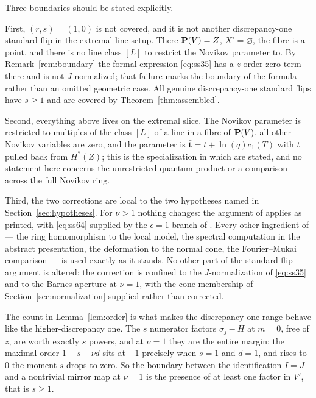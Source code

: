 Three boundaries should be stated explicitly.

First, \((r,s)=(1,0)\) is not covered, and it is not another
discrepancy-one standard flip in the extremal-line setup.  There
\(\mathbf P(V)=Z\), \(X'=\varnothing\), the fibre is a point, and there is no line
class \([L]\) to restrict the Novikov parameter to.  By
Remark~\ref{rem:boundary} the formal expression \eqref{eq:ss35} has a
\(z\)-order-zero term there and is not \(J\)-normalized; that failure marks
the boundary of the formula rather than an omitted geometric case.  All
genuine discrepancy-one standard flips have \(s\ge1\) and are covered by
Theorem~\ref{thm:assembled}.

Second, everything above lives on the extremal slice.  The Novikov
parameter is restricted to multiples of the class \([L]\) of a line in a
fibre of \(\mathbf P(V)\), all other Novikov variables are zero, and the parameter
is \(\bar{\mathbf t}=t+\ln(q)c_{1}(T)\) with \(t\) pulled back from
\(H^{*}(Z)\); this is the specialization in which \cite[Theorems~1.2
and~1.4]{SS} are stated, and no statement here concerns the unrestricted
quantum product or a comparison across the full Novikov ring.

Third, the two corrections are local to the two hypotheses named in
Section~\ref{sec:hypotheses}.  For \(\nu>1\) nothing changes: the argument
of \cite{SS} applies as printed, with \eqref{eq:ss64} supplied by the
\(\epsilon=1\) branch of \cite[Theorem~A.1]{SS}.  Every other
ingredient of \cite{SS} --- the ring homomorphism to the local model, the
spectral computation in the abstract presentation, the deformation to the
normal cone, the Fourier--Mukai comparison --- is used exactly as it stands.
No other part of the standard-flip argument is altered: the correction is
confined to the \(J\)-normalization of \eqref{eq:ss35} and to the Barnes
aperture at \(\nu=1\), with the cone membership of
Section~\ref{sec:normalization} supplied rather than corrected.

The count in Lemma~\ref{lem:order} is what makes the discrepancy-one range
behave like the higher-discrepancy one.  The \(s\) numerator factors
\(\sigma_{j}-H\) at \(m=0\), free of \(z\), are worth exactly \(s\) powers,
and at \(\nu=1\) they are the entire margin: the maximal order
\(1-s-\nu d\) sits at \(-1\) precisely when \(s=1\) and \(d=1\), and rises
to \(0\) the moment \(s\) drops to zero.  So the boundary between the
identification \(I=J\) and a nontrivial mirror map at \(\nu=1\) is the
presence of at least one factor in \(V'\), that is \(s\ge1\).
